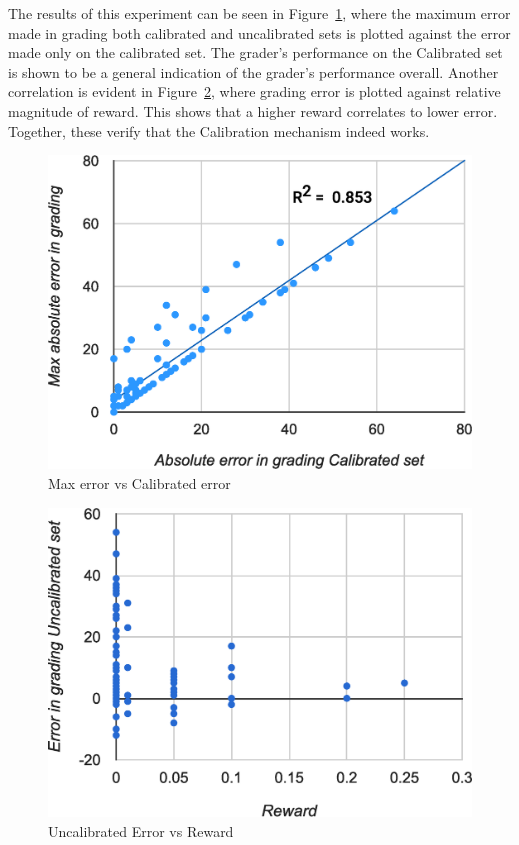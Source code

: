 \documentclass{chi-ext}
\begin{document}
The results of this experiment can be seen in Figure~\ref{fig:error-calibration}, where the maximum error made in grading both calibrated and uncalibrated sets is plotted against the error made only on the calibrated set. The grader's performance on the Calibrated set is shown to be a general indication of the grader's performance overall. Another correlation is evident in Figure~\ref{fig:reward-error}, where grading error is plotted against relative magnitude of reward. This shows that a higher reward correlates to lower error. Together, these verify that the Calibration mechanism indeed works.

\begin{figure}
  \centering
  \includegraphics[width=\linewidth]{Error-Calibration-Graph.eps}
  \caption{Max error vs Calibrated error}
  \label{fig:error-calibration}
\end{figure}

\begin{figure}
  \centering
  \includegraphics[width=\linewidth]{Reward-Error-Graph.eps}
  \caption{Uncalibrated Error vs Reward}
  \label{fig:reward-error}
\end{figure}
\end{document}
